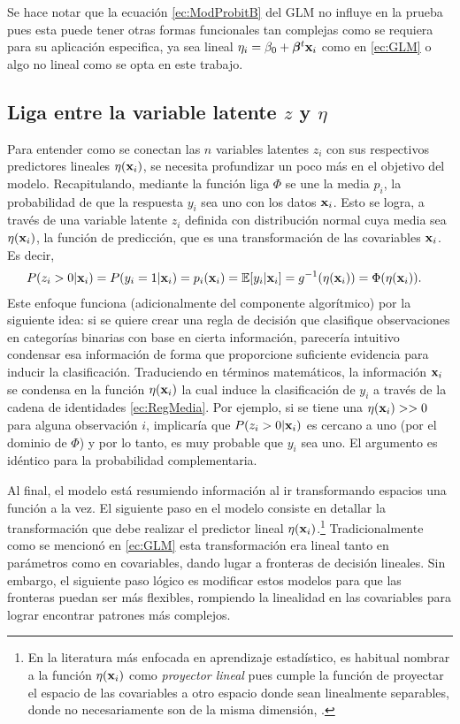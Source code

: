 \documentclass[../Main/Main.tex]{subfiles}
\begin{document}
Se hace notar que la ecuación \eqref{ec:ModProbitB} del GLM no influye en la prueba pues esta puede tener otras formas funcionales tan complejas como se requiera para su aplicación especifica, ya sea lineal $\eta_i = \beta_0 + \bm{\beta}^t\mathbf{x}_i$ como en \eqref{ec:GLM} o algo no lineal como se opta en este trabajo.

\subsection*{Liga entre la variable latente $z$ y $\eta$} \label{sec:VarLat}
Para entender como se conectan las $n$ variables latentes $z_i$ con sus respectivos predictores lineales $\eta(\mathbf{x}_i)$, se necesita profundizar un poco más en el objetivo del modelo. Recapitulando, mediante la función liga $\Phi$ se une la media $p_i$, la probabilidad de que la respuesta $y_i$ sea uno con los datos $\mathbf{x}_i$. Esto se logra, a través de una variable latente $z_i$ definida con distribución normal cuya media sea $\eta(\mathbf{x}_i)$, la función de predicción, que es una transformación de las covariables $\mathbf{x}_i$. Es decir,
\begin{align} \label{ec:RegMedia}
	P(z_i > 0|\mathbf{x}_i) = P(y_i = 1|\mathbf{x}_i)= p_i(\mathbf{x}_i) &=\mathbb{E}[y_i|\mathbf{x}_i] = g^{-1}(\eta(\mathbf{x}_i)) = \Phi(\eta(\mathbf{x}_i)).
\end{align}
Este enfoque funciona (adicionalmente del componente algorítmico) por la siguiente idea: si se quiere crear una regla de decisión que clasifique observaciones en categorías binarias con base en cierta información, parecería intuitivo condensar esa información de forma que proporcione suficiente evidencia para inducir la clasificación. Traduciendo en términos matemáticos, la información $\mathbf{x}_i$ se condensa en la función $\eta(\mathbf{x}_i)$ la cual induce la clasificación de $y_i$ a través de la cadena de identidades \eqref{ec:RegMedia}. Por ejemplo, si se tiene una $\eta(\mathbf{x}_i)>>0$ para alguna observación $i$, implicaría que $P(z_i > 0|\mathbf{x}_i)$ es cercano a uno (por el dominio de $\Phi$) y por lo tanto, es muy probable que $y_i$ sea uno. El argumento es idéntico para la probabilidad complementaria.

Al final, el modelo está resumiendo información al ir transformando espacios una función a la vez. El siguiente paso en el modelo consiste en detallar la transformación que debe realizar el predictor lineal $\eta(\mathbf{x}_i)$.\footnote{En la literatura más enfocada en aprendizaje estadístico, es habitual nombrar a la función $\eta(\mathbf{x}_i)$ como  \textit{proyector lineal} pues cumple la función de proyectar el espacio de las covariables a otro espacio donde sean linealmente separables, donde no necesariamente son de la misma dimensión, \citet{bishop2006pattern}.} Tradicionalmente como se mencionó en \eqref{ec:GLM} esta transformación era lineal tanto en parámetros como en covariables, dando lugar a fronteras de decisión lineales. Sin embargo, el siguiente paso lógico es modificar estos modelos para que las fronteras puedan ser más flexibles, rompiendo la linealidad en las covariables para lograr encontrar patrones más complejos. 
\end{document}
